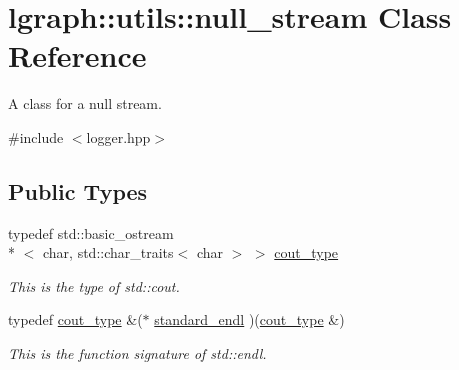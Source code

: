 \hypertarget{classlgraph_1_1utils_1_1null__stream}{\section{lgraph\-:\-:utils\-:\-:null\-\_\-stream Class Reference}
\label{classlgraph_1_1utils_1_1null__stream}
}


A class for a null stream.  




{\ttfamily \#include $<$logger.\-hpp$>$}

\subsection*{Public Types}
\begin{DoxyCompactItemize}
\item 
\hypertarget{classlgraph_1_1utils_1_1null__stream_ae3f818cbd342cb6da9f15677252da938}{typedef std\-::basic\-\_\-ostream\\*
$<$ char, std\-::char\-\_\-traits$<$ char $>$ $>$ \hyperlink{classlgraph_1_1utils_1_1null__stream_ae3f818cbd342cb6da9f15677252da938}{cout\-\_\-type}}\label{classlgraph_1_1utils_1_1null__stream_ae3f818cbd342cb6da9f15677252da938}

\begin{DoxyCompactList}\small\item\em This is the type of std\-::cout. \end{DoxyCompactList}\item 
\hypertarget{classlgraph_1_1utils_1_1null__stream_ad5453d44dda5265d0075dbe394df4618}{typedef \hyperlink{classlgraph_1_1utils_1_1null__stream_ae3f818cbd342cb6da9f15677252da938}{cout\-\_\-type} \&($\ast$ \hyperlink{classlgraph_1_1utils_1_1null__stream_ad5453d44dda5265d0075dbe394df4618}{standard\-\_\-endl} )(\hyperlink{classlgraph_1_1utils_1_1null__stream_ae3f818cbd342cb6da9f15677252da938}{cout\-\_\-type} \&)}\label{classlgraph_1_1utils_1_1null__stream_ad5453d44dda5265d0075dbe394df4618}

\begin{DoxyCompactList}\small\item\em This is the function signature of std\-::endl. \end{DoxyCompactList}\end{DoxyCompactItemize}
